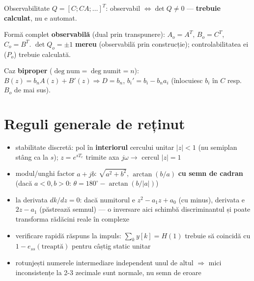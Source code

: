 \documentclass[8.2pt,a4paper,twocolumn]{extarticle}
\begin{document}
Observabilitate $Q=[C;CA;\ldots]^T$: observabil $\Leftrightarrow\det Q\ne0$ --- \textbf{trebuie calculat}, nu e automat.

Formă complet \textbf{observabilă} (dual prin transpunere): $A_o=A^T$, $B_o=C^T$, $C_o=B^T$. $\det Q_o=\pm1$ \textbf{mereu} (observabilă prin construcție); controlabilitatea ei ($P_o$) trebuie calculată.

Caz \textbf{biproper} ($\deg\text{num}=\deg\text{numit}=n$): $B(z)=b_nA(z)+B'(z)\Rightarrow D=b_n$, $b_i'=b_i-b_na_i$ (înlocuiesc $b_i$ în $C$ resp. $B_o$ de mai sus).

\section*{Reguli generale de reținut}
\begin{itemize}[leftmargin=1.1em]
\item stabilitate discretă: pol în \textbf{interiorul} cercului unitar $|z|<1$ (nu semiplan stâng ca la $s$); $z=e^{sT_e}$ trimite axa $j\omega\to$ cercul $|z|=1$
\item modul/unghi factor $a+jb$: $\sqrt{a^2+b^2}$, $\arctan(b/a)$ \textbf{cu semn de cadran} (dacă $a<0,b>0$: $\theta=180^\circ-\arctan(b/|a|)$)
\item la derivata $dk/dz=0$: dacă numitorul e $z^2-a_1z+a_0$ (cu minus), derivata e $2z-a_1$ (păstrează semnul) --- o inversare aici schimbă discriminantul și poate transforma rădăcini reale în complexe
\item verificare rapidă răspuns la impuls: $\sum_k y[k]=H(1)$ trebuie să coincidă cu $1-e_{ss}(\text{treaptă})$ pentru câștig static unitar
\item rotunjești numerele intermediare independent unul de altul $\Rightarrow$ mici inconsistențe la 2-3 zecimale sunt normale, nu semn de eroare
\end{itemize}
\end{document}
